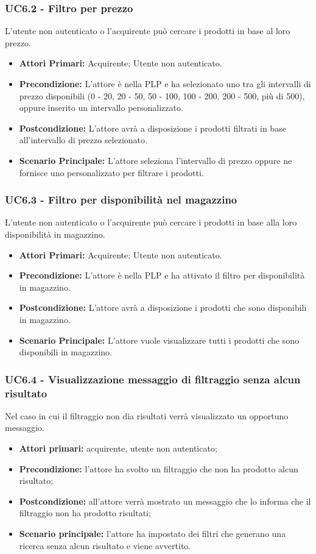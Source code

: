 \subsubsection{UC6.2 - Filtro per prezzo} \label{UC6.2}
L'utente non autenticato o l'acquirente può cercare i prodotti in base al loro prezzo.
\begin{itemize}
    \item \textbf{Attori Primari:} Acquirente; Utente non autenticato.
    \item \textbf{Precondizione:} L'attore è nella PLP e ha selezionato uno tra gli intervalli di prezzo disponibili (0 - 20, 20 - 50, 50 - 100, 100 - 200, 200 - 500, più di 500), oppure inserito un intervallo personalizzato.
    \item \textbf{Postcondizione:} L'attore avrà a disposizione i prodotti filtrati in base all'intervallo di prezzo selezionato.
    \item \textbf{Scenario Principale:} L'attore seleziona l'intervallo di prezzo oppure ne fornisce uno personalizzato per filtrare i prodotti.
\end{itemize}

\subsubsection{UC6.3 - Filtro per disponibilità nel magazzino} \label{UC6.3}
L'utente non autenticato o l'acquirente può cercare i prodotti in base alla loro disponibilità in magazzino.
\begin{itemize}
    \item \textbf{Attori Primari:} Acquirente; Utente non autenticato.
    \item \textbf{Precondizione:} L'attore è nella PLP e ha attivato il filtro per disponibilità in magazzino.
    \item \textbf{Postcondizione:} L'attore avrà a disposizione i prodotti che sono disponibili in magazzino.
    \item \textbf{Scenario Principale:} L'attore vuole visualizzare tutti i prodotti che sono disponibili in magazzino.
\end{itemize}

\subsubsection{UC6.4 - Visualizzazione messaggio di filtraggio senza alcun risultato} \label{UC6.4}
Nel caso in cui il filtraggio non dia risultati verrà visualizzato un opportuno messaggio.
\begin{itemize}
	\item \textbf{Attori primari:} acquirente, utente non autenticato;
	\item \textbf{Precondizione:} l'attore ha svolto un filtraggio che non ha prodotto alcun risultato;
	\item \textbf{Postcondizione:} all'attore verrà mostrato un messaggio che lo informa che il filtraggio non ha prodotto risultati;
	\item \textbf{Scenario principale:} l'attore ha impostato dei filtri che generano una ricerca senza alcun risultato e viene avvertito.
\end{itemize}